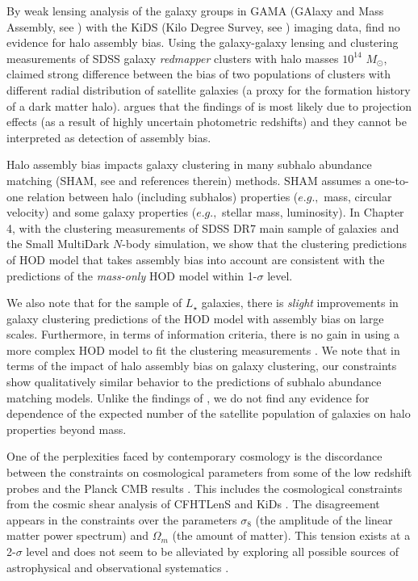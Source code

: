 By weak lensing analysis of the galaxy groups in GAMA (GAlaxy and Mass Assembly, see \citealt{driver}) 
with the KiDS (Kilo Degree Survey, see \citealt{kuijken2015}) imaging data, \citet{dvornik2017} find no evidence for halo assembly bias.
Using the galaxy-galaxy lensing and clustering measurements of SDSS galaxy \emph{redmapper} clusters \citep{rykoff} with halo masses $10^{14}$ $M_{\odot}$, 
\citet{miyatake2016} claimed strong difference between the bias of two populations of clusters with different radial distribution of satellite galaxies 
(a proxy for the formation history of a dark matter halo). \citet{zuetal2016} argues that the findings of \citet{miyatake2016} is most likely due to projection effects (as a result of highly uncertain photometric redshifts) and they cannot be interpreted as detection of assembly bias. 

Halo assembly bias impacts galaxy clustering in many subhalo abundance matching (SHAM, see \citealt{hearin2014,lehman2015} and references therein) methods. SHAM assumes a one-to-one relation between halo (including subhalos) properties ($e.g.,$ mass, circular velocity) and some galaxy properties ($e.g.,$ stellar mass, luminosity). In Chapter 4, with the clustering measurements of SDSS DR7 main sample of galaxies \citep{abazajian2009} and the Small MultiDark $N$-body simulation, we show that the clustering predictions of \citep{decorated} HOD model that takes assembly bias into account are consistent with the predictions of the \emph{mass-only} HOD model within 1-$\sigma$ level. 

We also note that for the sample of $L_{\star}$ galaxies, there is \emph{slight} improvements in galaxy clustering predictions of the HOD model with assembly bias 
on large scales. Furthermore, in terms of information criteria, there is no gain in using a more complex HOD model to fit the clustering measurements \citep{decorated}.
We note that in terms of the impact of halo assembly bias on galaxy clustering, our constraints show qualitatively similar behavior to the predictions of subhalo abundance matching models. Unlike the findings of \citet{zentner2016}, we do not find any evidence for dependence of the expected number of the satellite population of galaxies on halo properties beyond mass.

One of the perplexities faced by contemporary cosmology is the discordance between the constraints on cosmological parameters from some of the low redshift probes and 
the Planck CMB results \citep{planckII}. This includes the cosmological constraints from the cosmic shear analysis of CFHTLenS \citep{heymans,kitching2016} and KiDs \citep{hildebrandt2017}. The disagreement appears in the constraints over the parameters $\sigma_{8}$ (the amplitude of the linear matter power spectrum) and $\Omega_{m}$ (the amount of matter). This tension exists at a 2-$\sigma$ level and does not seem to be alleviated by exploring all possible sources of astrophysical and observational systematics \citep{battye2014,boris2014,maccrann2015,grandis2016,raveri2016}. 

